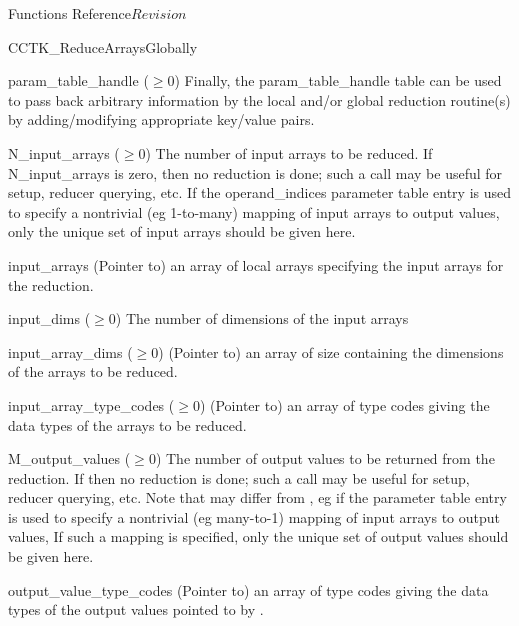 \begin{cactuspart}{ Functions Reference}{}{$Revision$}
\begin{FunctionDescription}{CCTK\_ReduceArraysGlobally}
\begin{ParameterSection}
\begin{Parameter}{param\_table\_handle ($\ge 0$)}
Finally, the  param\_table\_handle  table can be used to pass back arbitrary
information by the local and/or global reduction routine(s) by
adding/modifying appropriate key/value pairs.
\end{Parameter}
\begin{Parameter}{N\_input\_arrays ($\ge 0$)}
The number of input arrays to be reduced.  If  N\_input\_arrays is zero,
then no reduction is done; such a call may be useful for setup,
reducer querying, etc.  If the  operand\_indices  parameter table
entry is used to specify a nontrivial (eg 1-to-many) mapping of input
arrays to output values, only the unique set of input arrays should
be given here.
\end{Parameter}
\begin{Parameter}{input\_arrays}
(Pointer to) an array of    local arrays specifying the input arrays
for the reduction.
\end{Parameter}
\begin{Parameter}{input\_dims ($\ge 0$)}
The number of dimensions of the input arrays
\end{Parameter}
\begin{Parameter}{input\_array\_dims ($\ge 0$)}
(Pointer to) an array  of size  containing the dimensions of the arrays to be reduced.
\end{Parameter}
\begin{Parameter}{input\_array\_type\_codes ($\ge 0$)}
(Pointer to) an array  of    type
codes giving the data types of the arrays to be reduced.
\end{Parameter}
\begin{Parameter}{M\_output\_values ($\ge 0$)}
The number of output values to be returned from the reduction.
If   then no reduction is done; such a call
may be useful for setup, reducer querying, etc.  Note that
  may differ from   , eg if the
  parameter table entry is used to specify a
nontrivial (eg many-to-1) mapping of input arrays to output values,
If such a mapping is specified, only the unique set of output values
should be given here.
\end{Parameter}
\begin{Parameter}{output\_value\_type\_codes}
(Pointer to) an array of     type
codes giving the data types of the output values pointed to by
.
\end{Parameter}

\end{ParameterSection}
\end{FunctionDescription}
\end{cactuspart}
